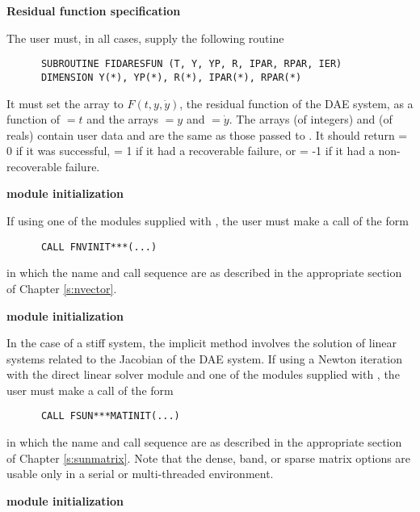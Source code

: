 %
\begin{Steps}

\item {\bf Residual function specification}

  The user must, in all cases, supply the following {\F} routine
\begin{verbatim}
      SUBROUTINE FIDARESFUN (T, Y, YP, R, IPAR, RPAR, IER)
      DIMENSION Y(*), YP(*), R(*), IPAR(*), RPAR(*)
\end{verbatim}
  It must set the  array to $F(t,y,\dot{y})$, the residual function of the DAE
  system, as a function of  $ = t$ and the arrays  $ = y$ and
   $ = \dot{y}$.
  The arrays  (of integers) and  (of reals) contain user data
  and are the same as those passed to .
  It should return  = 0 if it was successful,
   = 1 if it had a recoverable failure, or
   = -1 if it had a non-recoverable failure.

\item  {\bf {\nvector} module initialization}

  If using one of the {\nvector} modules supplied with {\sundials},
  the user must make a call of the form
\begin{verbatim}
      CALL FNVINIT***(...)
\end{verbatim}
in which the name and call sequence are as described in the appropriate
section of Chapter \ref{s:nvector}.


\item\label{i:fida_matrix_init} {\bf {\sunmatrix} module initialization}

  In the case of a stiff system, the implicit  method involves the solution
  of linear systems related to the Jacobian
  of the DAE system.  If using a Newton iteration with the direct {\sunlinsol} linear solver
  module and one of the {\sunmatrix} modules supplied with {\sundials},
  the user must make a call of the form
\begin{verbatim}
      CALL FSUN***MATINIT(...)
\end{verbatim}
in which the name and call sequence are as described in the appropriate
section of Chapter \ref{s:sunmatrix}.  Note that the dense, band, or
sparse matrix options are usable only in a serial or multi-threaded
environment.


\item\label{i:fida_linsol_init} {\bf {\sunlinsol} module initialization}


\end{Steps}
